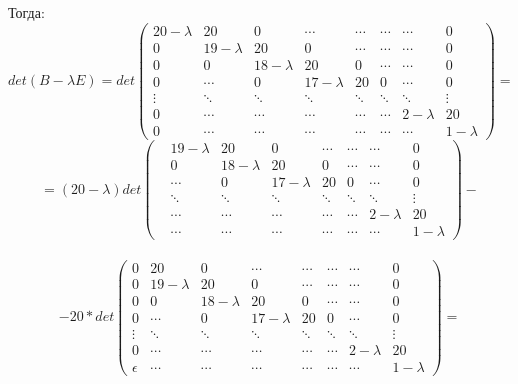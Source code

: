     Тогда:
    \[
    det(B-\lambda E) = 
    det \begin{pmatrix}
    20-\lambda & 20 & 0 &\cdots & \cdots &\cdots & \cdots &0  \\
    0 & 19-\lambda & 20 & 0 & \cdots &\cdots  & \cdots & 0\\
    0 & 0 & 18-\lambda & 20 & 0 &\cdots & \cdots & 0\\
    0 &\cdots& 0 & 17-\lambda & 20 & 0 & \cdots & 0\\
    \vdots & \ddots & \ddots & \ddots & \ddots & \ddots & \ddots & \vdots \\

    0 & \cdots & \cdots & \cdots & \cdots & \cdots & 2-\lambda & 20\\
    
    0 & \cdots & \cdots & \cdots & \cdots & \cdots & \cdots & 1-\lambda
    \end{pmatrix}
    = \]
    \[
    = (20-\lambda) 
    det \begin{pmatrix}
    & 19-\lambda & 20 & 0 & \cdots &\cdots  & \cdots & 0\\
    & 0 & 18-\lambda & 20 & 0 &\cdots & \cdots & 0\\
    &\cdots& 0 & 17-\lambda & 20 & 0 & \cdots & 0\\
    & \ddots & \ddots & \ddots & \ddots & \ddots & \ddots & \vdots \\

    & \cdots & \cdots & \cdots & \cdots & \cdots & 2-\lambda & 20\\
    
    & \cdots & \cdots & \cdots & \cdots & \cdots & \cdots & 1-\lambda
    \end{pmatrix}
    - \] \\
    \[
    -20 * 
    det \begin{pmatrix}
    0 & 20 & 0 &\cdots & \cdots &\cdots & \cdots &0  \\
    0 & 19-\lambda & 20 & 0 & \cdots &\cdots  & \cdots & 0\\
    0 & 0 & 18-\lambda & 20 & 0 &\cdots & \cdots & 0\\
    0 &\cdots& 0 & 17-\lambda & 20 & 0 & \cdots & 0\\
    \vdots & \ddots & \ddots & \ddots & \ddots & \ddots & \ddots & \vdots \\

    0 & \cdots & \cdots & \cdots & \cdots & \cdots & 2-\lambda & 20\\
    
    \epsilon & \cdots & \cdots & \cdots & \cdots & \cdots & \cdots & 1-\lambda
    \end{pmatrix} =\]
